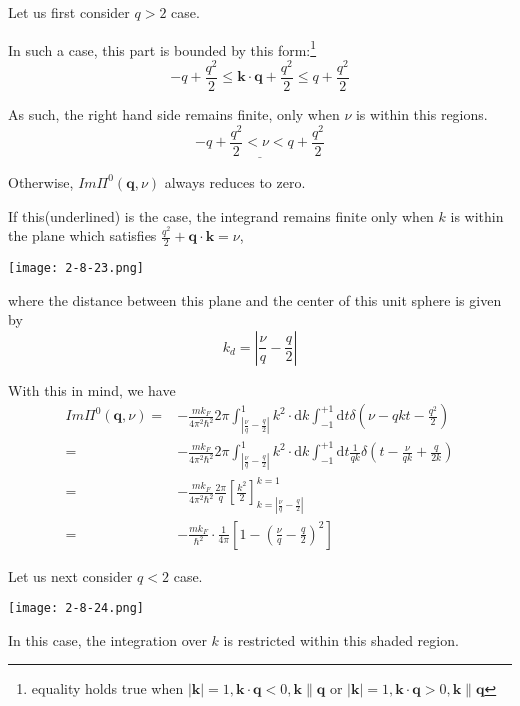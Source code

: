 Let us first consider $q>2$ case.

In such a case, this part is bounded by this form:\footnote{equality holds true when $|\mathbf{k}|=1,\mathbf{k}\cdot \mathbf{q} < 0, \mathbf{k} \parallel \mathbf{q}$ or $|\mathbf{k}|=1,\mathbf{k}\cdot \mathbf{q} > 0, \mathbf{k} \parallel \mathbf{q}$}
\[ -q + \frac{q^2}{2} \leq \mathbf{k}\cdot\mathbf{q}+\frac{q^2}{2} \leq q+ \frac{q^2}{2} \]

As such, the right hand side remains finite, only when $\nu$ is within this regions.
\[ \underline{-q + \frac{q^2}{2} < \nu < q + \frac{q^2}{2}} \]

Otherwise, $Im\Pi^0(\mathbf{q},\nu)$ always reduces to zero.

If this(underlined) is the case, the integrand remains finite only when $k$ is within the plane which satisfies $\frac{q^2}{2}+\mathbf{q}\cdot \mathbf{k} = \nu$,
\begin{center} \label{Fig2.8.23}
\texttt{[image: 2-8-23.png]}
\end{center}

where the distance between this plane and the center of this unit sphere is given by
\[ k_d = |\frac{\nu}{q} - \frac{q}{2}| \]

With this in mind, we have
\begin{equation} \label{Eqs2.8.21} \begin{split}
Im\Pi^0(\mathbf{q},\nu) =& -\frac{m k_F}{4\pi^2 \hbar^2} 2\pi \int_{|\frac{\nu}{q}-\frac{q}{2}|}^1 k^2 \cdot \mathrm{d}k \int_{-1}^{+1} \mathrm{d}t \delta(\nu-qkt -\frac{q^2}{2})\\
=& -\frac{m k_F}{4\pi^2 \hbar^2} 2\pi \int_{|\frac{\nu}{q}-\frac{q}{2}|}^1 k^2 \cdot \mathrm{d}k \int_{-1}^{+1} \mathrm{d}t \frac{1}{qk}\delta(t - \frac{\nu}{qk} + \frac{q}{2k})\\
=&-\frac{m k_F}{4\pi^2 \hbar^2} \frac{2\pi}{q} \left[ \frac{k^2}{2} \right]_{k=|\frac{\nu}{q}-\frac{q}{2}|}^{k=1}\\
=&-\frac{m k_F}{\hbar^2} \cdot \frac{1}{4\pi} \left[ 1-\left( \frac{\nu}{q}-\frac{q}{2} \right)^2 \right]
\end{split}\end{equation}

Let us next consider $q<2$ case.
\begin{center}\label{Fig2.8.24}
\texttt{[image: 2-8-24.png]}
\end{center}

In this case, the integration over $k$ is restricted within this shaded region.


